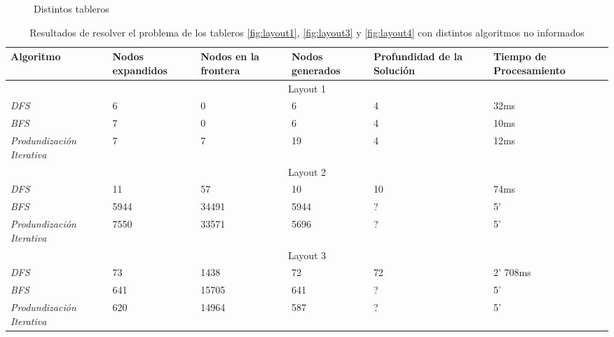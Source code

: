 \documentclass{sig-alternate}
\begin{document}
\begin{figure}[h!]
\begin{center}
  \end{center}
  \caption{Distintos tableros}
  \label{fig:layouts}
\end{figure}
	
	
\begin{table}[h]
\begin{center}
	\begin{tabular}{|p{2.3cm}|p{2cm}|p{2cm}|p{2cm}|p{2cm}|p{4cm}|}
	\hline
	 Algoritmo & Nodos expandidos & Nodos en la frontera & Nodos generados & Profundidad de la Soluci\'on & Tiempo de Procesamiento\\
	\hline \hline
		 \multicolumn{6}{|c|}{Layout 1} \\
	\hline
	\textit{DFS} & 6 & 0 & 6 & 4 & 32ms \\
	\textit{BFS} & 7 & 0 & 6 & 4 & 10ms \\
	\textit{Produndizaci\'on Iterativa} & 7 & 7 & 19 & 4 & 12ms \\
	\hline
		 \multicolumn{6}{|c|}{Layout 2} \\
	\hline
	\textit{DFS} & 11 & 57 & 10 & 10 & 74ms \\
	\textit{BFS} &5944 & 34491 & 5944 & ? & 5' \\
	\textit{Produndizaci\'on Iterativa} & 7550 & 33571 & 5696 & ? & 5' \\
	\hline
		 \multicolumn{6}{|c|}{Layout 3} \\
	\hline
	\textit{DFS} & 73 & 1438 & 72 & 72 & 2' 708ms \\
	\textit{BFS} & 641 & 15705 & 641 & ? & 5' \\
	\textit{Produndizaci\'on Iterativa} & 620 & 14964 & 587 & ? & 5' \\
	\hline
	\end{tabular}
\end{center}
\caption{Resultados de resolver el problema de los tableros \ref{fig:layout1}, \ref{fig:layout3} y \ref{fig:layout4} con distintos algoritmos no informados}
\label{tab:cost}
\end{table}
\end{document}
